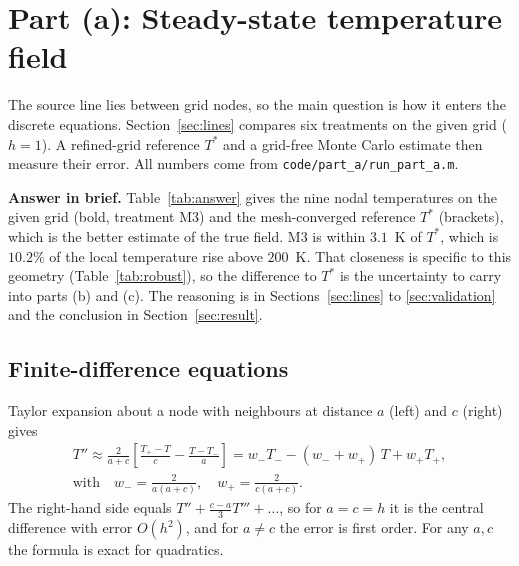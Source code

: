 \section{Part (a): Steady-state temperature field}\label{sec:a}

The source line lies between grid nodes, so the main question is how it enters the discrete equations.
Section~\ref{sec:lines} compares six treatments on the given grid ($h=1$). A refined-grid reference $T^*$ and a grid-free
Monte Carlo estimate then measure their error. All numbers come from \texttt{code/part\_a/run\_part\_a.m}.

\textbf{Answer in brief.} Table~\ref{tab:answer} gives the nine nodal temperatures on the given grid (bold, treatment M3) and
the mesh-converged reference $T^*$ (brackets), which is the better estimate of the true field. M3 is within $3.1$~K of $T^*$,
which is $10.2\%$ of the local temperature rise above $200$~K. That closeness is specific to this geometry (Table~\ref{tab:robust}),
so the difference to $T^*$ is the uncertainty to carry into parts (b) and (c). The reasoning is in Sections~\ref{sec:lines} to
\ref{sec:validation} and the conclusion in Section~\ref{sec:result}.

\begin{table}[H]
\centering\small

\caption{Steady-state temperatures [K] at the nine interior nodes. Bold: M3 on the given grid ($h=1$).
Brackets: reference $T^*$ ($\pm0.5$~K). Largest deviation $3.1$~K.}
\label{tab:answer}
\end{table}

\subsection{Finite-difference equations}

Taylor expansion about a node with neighbours at distance $a$ (left) and $c$ (right) gives
\begin{gather}
  T''\approx\frac{2}{a+c}\left[\frac{T_+-T}{c}-\frac{T-T_-}{a}\right]
  = w_-T_- - (w_-+w_+)\,T + w_+T_+, \label{eq:fd}\\
  \text{with}\quad w_-=\frac{2}{a(a+c)},\quad w_+=\frac{2}{c(a+c)}. \nonumber
\end{gather}
The right-hand side equals $T''+\tfrac{c-a}{3}T'''+\dots$, so for $a=c=h$ it is the central difference with error $O(h^2)$,
and for $a\ne c$ the error is first order. For any $a,c$ the formula is exact for quadratics.

